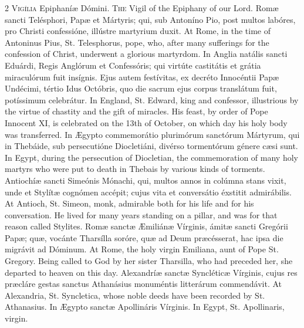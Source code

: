 \begin{paracol}{2}
\lettrine[lines=1]{V}{igília} Epiphaníæ Dómini.
\switchcolumn
{}
\lettrine[lines=1]{T}{he} Vigil of the Epiphany of our Lord.
\switchcolumn*
{}
Romæ sancti Telésphori, Papæ et Mártyris; qui, 
 sub Antoníno Pio, post multos labóres, pro Christi confessióne, illústre 
 martyrium duxit.
\switchcolumn
{}
At Rome, in the time of Antoninus Pius, St. Telesphorus, pope, who, after 
 many sufferings for the confession of Christ, underwent a glorious 
 martyrdom.
\switchcolumn*
{}
In Anglia natális sancti Eduárdi, Regis Anglórum et Confessóris; qui virtúte 
 castitátis et grátia miraculórum fuit insígnis. Ejus autem festívitas, 
 ex decréto Innocéntii Papæ Undécimi, tértio 
 Idus Octóbris, quo die sacrum ejus corpus translátum fuit, potíssimum 
 celebrátur.
\switchcolumn
{}
In England, St. Edward, king and confessor, illustrious by the virtue of 
 chastity and the gift of miracles. His feast, by order of Pope 
 Innocent XI, is celebrated on the 13th of October, on which day his holy 
 body was transferred.
\switchcolumn*
{}
In Ægypto commemorátio plurimórum sanctórum 
 Mártyrum, qui in Thebáide, sub persecutióne Diocletiáni, divérso tormentórum 
 génere cæsi sunt.
\switchcolumn
{}
In Egypt, during the persecution of Diocletian, the commemoration of many 
 holy martyrs who were put to death in Thebais by various kinds of torments.
\switchcolumn*
{}
Antiochíæ sancti Simeónis Mónachi, qui, multos 
 annos in colúmna stans vixit, unde et Stylítæ cognómen accépit; cujus vita 
 et conversátio éxstitit admirábilis.
\switchcolumn
{}
At Antioch, St. Simeon, monk, admirable both for his life and for his 
 conversation. He lived for many years standing on a pillar, and was 
 for that reason called Stylites.
\switchcolumn*
{}
Romæ sanctæ Æmiliánæ Vírginis, ámitæ sancti 
 Gregórii Papæ; quæ, vocánte Tharsílla soróre, quæ ad Deum præcésserat, hac 
 ipsa die migrávit ad Dóminum.
\switchcolumn
{}
At Rome, the holy virgin Emiliana, aunt of Pope St. Gregory. Being 
 called to God by her sister Tharsilla, who had preceded her, she departed to 
 heaven on this day.
\switchcolumn*
{}
Alexandríæ sanctæ Syncléticæ Vírginis, cujus 
 res præcláre gestas sanctus Athanásius monuméntis litterárum commendávit.
\switchcolumn
{}
At Alexandria, St. Syncletica, whose noble deeds have been recorded by St. 
 Athanasius.
\switchcolumn*
{}
In Ægypto sanctæ Apollináris Vírginis.
\switchcolumn
{}
In Egypt, St. Apollinaris, virgin.
\switchcolumn*
{}
\end{paracol}


